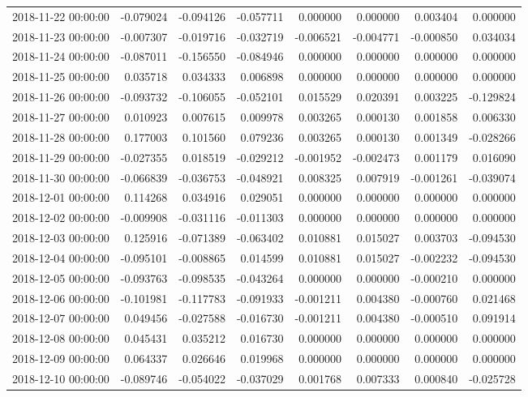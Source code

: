 \begin{tabular}{lrrrrrrr}
2018-11-22 00:00:00 & -0.079024 & -0.094126 & -0.057711 & 0.000000 & 0.000000 & 0.003404 & 0.000000 \\
2018-11-23 00:00:00 & -0.007307 & -0.019716 & -0.032719 & -0.006521 & -0.004771 & -0.000850 & 0.034034 \\
2018-11-24 00:00:00 & -0.087011 & -0.156550 & -0.084946 & 0.000000 & 0.000000 & 0.000000 & 0.000000 \\
2018-11-25 00:00:00 & 0.035718 & 0.034333 & 0.006898 & 0.000000 & 0.000000 & 0.000000 & 0.000000 \\
2018-11-26 00:00:00 & -0.093732 & -0.106055 & -0.052101 & 0.015529 & 0.020391 & 0.003225 & -0.129824 \\
2018-11-27 00:00:00 & 0.010923 & 0.007615 & 0.009978 & 0.003265 & 0.000130 & 0.001858 & 0.006330 \\
2018-11-28 00:00:00 & 0.177003 & 0.101560 & 0.079236 & 0.003265 & 0.000130 & 0.001349 & -0.028266 \\
2018-11-29 00:00:00 & -0.027355 & 0.018519 & -0.029212 & -0.001952 & -0.002473 & 0.001179 & 0.016090 \\
2018-11-30 00:00:00 & -0.066839 & -0.036753 & -0.048921 & 0.008325 & 0.007919 & -0.001261 & -0.039074 \\
2018-12-01 00:00:00 & 0.114268 & 0.034916 & 0.029051 & 0.000000 & 0.000000 & 0.000000 & 0.000000 \\
2018-12-02 00:00:00 & -0.009908 & -0.031116 & -0.011303 & 0.000000 & 0.000000 & 0.000000 & 0.000000 \\
2018-12-03 00:00:00 & 0.125916 & -0.071389 & -0.063402 & 0.010881 & 0.015027 & 0.003703 & -0.094530 \\
2018-12-04 00:00:00 & -0.095101 & -0.008865 & 0.014599 & 0.010881 & 0.015027 & -0.002232 & -0.094530 \\
2018-12-05 00:00:00 & -0.093763 & -0.098535 & -0.043264 & 0.000000 & 0.000000 & -0.000210 & 0.000000 \\
2018-12-06 00:00:00 & -0.101981 & -0.117783 & -0.091933 & -0.001211 & 0.004380 & -0.000760 & 0.021468 \\
2018-12-07 00:00:00 & 0.049456 & -0.027588 & -0.016730 & -0.001211 & 0.004380 & -0.000510 & 0.091914 \\
2018-12-08 00:00:00 & 0.045431 & 0.035212 & 0.016730 & 0.000000 & 0.000000 & 0.000000 & 0.000000 \\
2018-12-09 00:00:00 & 0.064337 & 0.026646 & 0.019968 & 0.000000 & 0.000000 & 0.000000 & 0.000000 \\
2018-12-10 00:00:00 & -0.089746 & -0.054022 & -0.037029 & 0.001768 & 0.007333 & 0.000840 & -0.025728 \\

\end{tabular}

